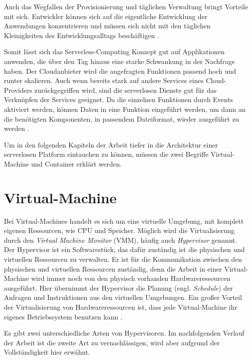 Auch das Wegfallen der Provisionierung und täglichen Verwaltung bringt Vorteile mit sich.
Entwickler können sich auf die eigentliche Entwicklung der Anwendungen konzentrieren und
müssen sich nicht mit den täglichen Kleinigkeiten des Entwicklungsalltags
beschäftigen \cite{DBLP:journals/corr/BaldiniCCCFIMMR17}.

Somit lässt sich das Serverless-Computing Konzept gut auf Applikationen anwenden,
die über den Tag hinaus eine starke Schwankung in der Nachfrage haben. Der Cloudanbieter wird
die angefragten Funktionen passend hoch und runter skalieren. Auch wenn bereits stark auf 
andere Services eines Cloud-Providers zurückgegriffen wird, sind die serverlosen Dienste
gut für das Verknüpfen der Services geeignet. Da die einzelnen Funktionen durch Events
aktiviert werden, können Daten in eine Funktion eingeführt werden, um
dann an die benötigten Komponenten, in passendem Dateiformat, wieder ausgeführt zu werden
\cite{DBLP:journals/corr/BaldiniCCCFIMMR17} \cite{HpcServerless}.

Um in den folgenden Kapiteln der Arbeit tiefer in die Architektur einer serverlosen Platform
eintauchen zu können, müssen die zwei Begriffe Virtual-Machine und Container erklärt werden.

\section{Virtual-Machine}
Bei Virtual-Machines handelt es sich um eine virtuelle Umgebung, mit komplett 
eigenen Ressourcen, wie CPU und Speicher.
Möglich wird die Virtualisierung durch den \textit{Virtual Machine Monitor} (VMM),
häufig auch \textit{Hypervisor} genannt.
Der Hypervisor ist ein Softwarestück, das dafür zuständig ist die physischen
und virtuellen Ressourcen zu verwalten. Er ist für die Kommunikation
zwischen den physischen und virtuellen Ressourcen zuständig, denn die Arbeit in einer
Virtual-Machine wird immer noch von den physisch vorhanden Hardwareressourcen ausgeführt.
Hier übernimmt der Hypervisor die Planung (engl. \textit{Schedule}) der Anfragen und Instruktionen
aus den virtuellen Umgebungen. Ein großer Vorteil der Virtualisierung von Hardwareressourcen ist,
dass jede Virtual-Machine ihr eigenes Betriebssystem benutzen kann
\cite{RedHatVM} \cite{RedHatHypervisor}.

Es gibt zwei unterschiedliche Arten von Hypervisoren. Im nachfolgenden Verlauf der Arbeit
ist die zweite Art zu vernachlässigen, wird aber aufgrund der Vollständigkeit hier erwähnt.

